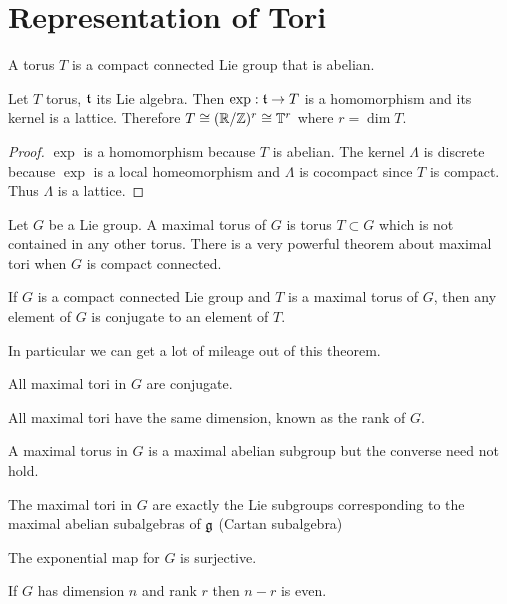 \documentclass[12pt]{article}
\begin{document}
\section{Representation of Tori}
A torus $T$ is a compact connected Lie group that is abelian. 
\begin{proposition}
Let $T$ torus, $\mathfrak{t}$ its Lie algebra. Then $\exp:\mathfrak{t} \to T$ is a homomorphism and its kernel is a lattice. Therefore $T\cong (\mathbb{R}/\mathbb{Z})^r\cong \mathbb{T}^r$ where $r=\dim T$.
\end{proposition}
\begin{proof}
    $\exp$ is a homomorphism because $T$ is abelian. The kernel $\Lambda$ is discrete because $\exp$ is a local homeomorphism and $\Lambda$ is cocompact since $T$ is compact. Thus $\Lambda$ is a lattice.
\end{proof}
Let $G$ be a Lie group. A maximal torus of $G$ is torus $T\subset G$ which is not contained in any other torus. There is a very powerful theorem about maximal tori when $G$ is compact connected. \begin{theorem}
    If $G$ is a compact connected Lie group and $T$ is a maximal torus of $G$, then any element of $G$ is conjugate to an element of $T$.
\end{theorem}
In particular we can get a lot of mileage out of this theorem.
\begin{corollary}
    All maximal tori in $G$ are conjugate.
\end{corollary}
\begin{corollary}
    All maximal tori have the same dimension, known as the rank of $G$.
\end{corollary}

\begin{corollary}
    A maximal torus in $G$ is a maximal abelian subgroup but the converse need not hold.
\end{corollary}

\begin{corollary}
    The maximal tori in $G$ are exactly the Lie subgroups corresponding to the maximal abelian subalgebras of $\mathfrak{g}$ (Cartan subalgebra)
\end{corollary}


\begin{corollary}
    The exponential map for $G$ is surjective.
\end{corollary}

\begin{corollary}
    If $G$ has dimension $n$ and rank $r$ then $n-r$ is even.
\end{corollary}
\end{document}
